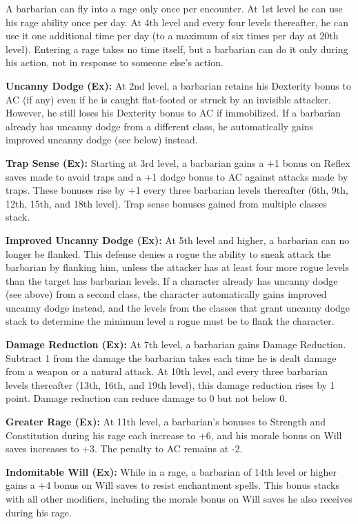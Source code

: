 A barbarian can fly into a rage only once per encounter. At 1st level he can use 
his rage ability once per day. At 4th level and every four levels thereafter, he 
can use it one additional time per day (to a maximum of six times per day at 20th 
level). Entering a rage takes no time itself, but a barbarian can do it only during 
his action, not in response to someone else's action.

\textbf{Uncanny Dodge (Ex):} At 2nd level, a barbarian retains his Dexterity bonus 
to AC (if any) even if he is caught flat-footed or struck by an invisible attacker. 
However, he still loses his Dexterity bonus to AC if immobilized. If a barbarian 
already has uncanny dodge from a different class, he automatically gains improved 
uncanny dodge (see below) instead.

\textbf{Trap Sense (Ex):} Starting at 3rd level, a barbarian gains a +1 bonus on 
Reflex saves made to avoid traps and a +1 dodge bonus to AC against attacks made 
by traps. These bonuses rise by +1 every three barbarian levels thereafter (6th, 
9th, 12th, 15th, and 18th level). Trap sense bonuses gained from multiple classes 
stack.

\textbf{Improved Uncanny Dodge (Ex):} At 5th level and higher, a barbarian can 
no longer be flanked. This defense denies a rogue the ability to sneak attack the 
barbarian by flanking him, unless the attacker has at least four more rogue levels 
than the target has barbarian levels. If a character already has uncanny dodge 
(see above) from a second class, the character automatically gains improved uncanny 
dodge instead, and the levels from the classes that grant uncanny dodge stack to 
determine the minimum level a rogue must be to flank the character.

\textbf{Damage Reduction (Ex):} At 7th level, a barbarian gains Damage Reduction. 
Subtract 1 from the damage the barbarian takes each time he is dealt damage from 
a weapon or a natural attack. At 10th level, and every three barbarian levels thereafter 
(13th, 16th, and 19th level), this damage reduction rises by 1 point. Damage reduction 
can reduce damage to 0 but not below 0.

\textbf{Greater Rage (Ex):} At 11th level, a barbarian's bonuses to Strength and 
Constitution during his rage each increase to +6, and his morale bonus on Will 
saves increases to +3. The penalty to AC remains at -2.

\textbf{Indomitable Will (Ex):} While in a rage, a barbarian of 14th level or higher 
gains a +4 bonus on Will saves to resist enchantment spells. This bonus stacks 
with all other modifiers, including the morale bonus on Will saves he also receives 
during his rage.

